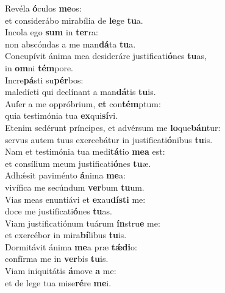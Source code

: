 \evenverse Revéla \textbf{ó}culos \textbf{me}os:~\*\\
\evenverse et considerábo mirabília de \textbf{le}ge \textbf{tu}a.\\
\oddverse Incola ego \textbf{sum} in \textbf{ter}ra:~\*\\
\oddverse non abscóndas a me man\textbf{dá}ta \textbf{tu}a.\\
\evenverse Concupívit ánima mea desideráre justificati\textbf{ó}nes \textbf{tu}as,~\*\\
\evenverse in \textbf{om}ni \textbf{tém}pore.\\
\oddverse Incre\textbf{pá}sti su\textbf{pér}bos:~\*\\
\oddverse maledícti qui declínant a man\textbf{dá}tis \textbf{tu}is.\\
\evenverse Aufer a me oppróbrium, \textbf{et} con\textbf{tém}ptum:~\*\\
\evenverse quia testimónia tua \textbf{ex}qui\textbf{sí}vi.\\
\oddverse Etenim sedérunt príncipes, et advérsum me \textbf{lo}que\textbf{bán}tur:~\*\\
\oddverse servus autem tuus exercebátur in justificati\textbf{ó}nibus \textbf{tu}is.\\
\evenverse Nam et testimónia tua medi\textbf{tá}tio \textbf{me}\textbf{a} est:~\*\\
\evenverse et consílium meum justificati\textbf{ó}nes \textbf{tu}æ.\\
\oddverse Adhǽsit paviménto \textbf{á}nima \textbf{me}a:~\*\\
\oddverse vivífica me secúndum \textbf{ver}bum \textbf{tu}um.\\
\evenverse Vias meas enuntiávi et \textbf{e}xau\textbf{dí}\textbf{sti} me:~\*\\
\evenverse doce me justificati\textbf{ó}nes \textbf{tu}as.\\
\oddverse Viam justificatiónum tuárum \textbf{ín}stru\textbf{e} me:~\*\\
\oddverse et exercébor in mira\textbf{bí}libus \textbf{tu}is.\\
\evenverse Dormitávit ánima \textbf{me}a præ \textbf{tǽ}\textbf{di}o:~\*\\
\evenverse confírma me in \textbf{ver}bis \textbf{tu}is.\\
\oddverse Viam iniquitátis \textbf{á}move \textbf{a} me:~\*\\
\oddverse et de lege tua mise\textbf{ré}re \textbf{me}i.\\
